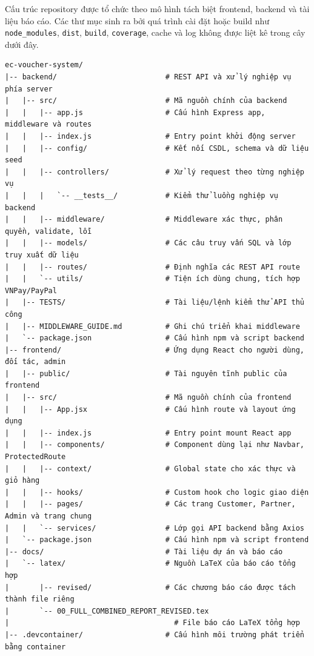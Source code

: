 ﻿\documentclass[12pt,a4paper]{report}
\begin{document}
Cấu trúc repository được tổ chức theo mô hình tách biệt frontend, backend và tài liệu báo cáo. Các thư mục sinh ra bởi quá trình cài đặt hoặc build như \texttt{node\_modules}, \texttt{dist}, \texttt{build}, \texttt{coverage}, cache và log không được liệt kê trong cây dưới đây.
\newpage
\begin{verbatim}
ec-voucher-system/
|-- backend/                         # REST API và xử lý nghiệp vụ phía server
|   |-- src/                         # Mã nguồn chính của backend
|   |   |-- app.js                   # Cấu hình Express app, middleware và routes
|   |   |-- index.js                 # Entry point khởi động server
|   |   |-- config/                  # Kết nối CSDL, schema và dữ liệu seed
|   |   |-- controllers/             # Xử lý request theo từng nghiệp vụ
|   |   |   `-- __tests__/           # Kiểm thử luồng nghiệp vụ backend
|   |   |-- middleware/              # Middleware xác thực, phân quyền, validate, lỗi
|   |   |-- models/                  # Các câu truy vấn SQL và lớp truy xuất dữ liệu
|   |   |-- routes/                  # Định nghĩa các REST API route
|   |   `-- utils/                   # Tiện ích dùng chung, tích hợp VNPay/PayPal
|   |-- TESTS/                       # Tài liệu/lệnh kiểm thử API thủ công
|   |-- MIDDLEWARE_GUIDE.md          # Ghi chú triển khai middleware
|   `-- package.json                 # Cấu hình npm và script backend
|-- frontend/                        # Ứng dụng React cho người dùng, đối tác, admin
|   |-- public/                      # Tài nguyên tĩnh public của frontend
|   |-- src/                         # Mã nguồn chính của frontend
|   |   |-- App.jsx                  # Cấu hình route và layout ứng dụng
|   |   |-- index.js                 # Entry point mount React app
|   |   |-- components/              # Component dùng lại như Navbar, ProtectedRoute
|   |   |-- context/                 # Global state cho xác thực và giỏ hàng
|   |   |-- hooks/                   # Custom hook cho logic giao diện
|   |   |-- pages/                   # Các trang Customer, Partner, Admin và trang chung
|   |   `-- services/                # Lớp gọi API backend bằng Axios
|   `-- package.json                 # Cấu hình npm và script frontend
|-- docs/                            # Tài liệu dự án và báo cáo
|   `-- latex/                       # Nguồn LaTeX của báo cáo tổng hợp
|       |-- revised/                 # Các chương báo cáo được tách thành file riêng
|       `-- 00_FULL_COMBINED_REPORT_REVISED.tex
|                                      # File báo cáo LaTeX tổng hợp
|-- .devcontainer/                   # Cấu hình môi trường phát triển bằng container

\end{verbatim}
\end{document}
